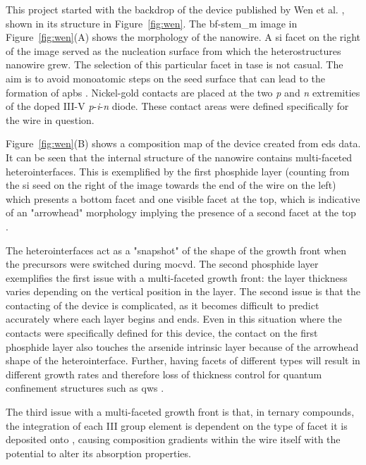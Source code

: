 This project started with the backdrop of the device published by Wen et al. \cite{Wen2022}, shown in its structure in Figure~\ref{fig:wen}. The \acs{bf}-\acs{stem_m} image in Figure~\ref{fig:wen}(A) shows the morphology of the nanowire. A  \acf{si} facet on the right of the image served as the nucleation surface from which the heterostructures nanowire grew. The selection of this particular facet in \acs{tase} is not casual. The aim is to avoid monoatomic steps on the seed surface that can lead to the formation of \acs{apb}s \cite{Kunert2018}. Nickel-gold contacts are placed at the two \textit{p} and \textit{n} extremities of the doped III-V \textit{p}-\textit{i}-\textit{n} diode. These contact areas were defined specifically for the wire in question. 

Figure~\ref{fig:wen}(B) shows a composition map of the device created from \acf{eds} data. It can be seen that the internal structure of the nanowire contains multi-faceted heterointerfaces. This is exemplified by the first phosphide layer (counting from the \acl{si} seed on the right of the image towards the end of the wire on the left) which presents a bottom  facet and one visible  facet at the top, which is indicative of an "arrowhead" morphology implying the presence of a second  facet at the top \cite{Knoedler2017, Borg2015, Borg2019}. 

The heterointerfaces act as a "snapshot" of the shape of the growth front when the precursors were switched during \acf{mocvd}. The second phosphide layer exemplifies the first issue with a multi-faceted growth front: the layer thickness varies depending on the vertical position in the layer. The second issue is that the contacting of the device is complicated, as it becomes difficult to predict accurately where each layer begins and ends. Even in this situation where the contacts were specifically defined for this device, the contact on the first phosphide layer also touches the arsenide intrinsic layer because of the arrowhead shape of the heterointerface. Further, having facets of different types will result in different growth rates and therefore loss of thickness control for quantum confinement structures such as \acl{qw}s \cite{Han2020}.

The third issue with a multi-faceted growth front is that, in ternary compounds, the integration of each III group element is dependent on the type of facet it is deposited onto \cite{Borg2019}, causing composition gradients within the wire itself with the potential to alter its absorption properties.

